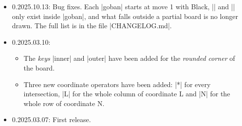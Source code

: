 \begin{itemize}
\begin{itemize}
				\begin{itemize}
					\item |\moves| numbers its moves; |numbers = false| leaves them without a number. |\move|, |\move*| and |\moves*| have been removed.
					\item |\stones| without a player draws neutral stones, like |\stone|.
					\item The only way to remember a board is |name| and |resume|; |goban/remember|, |goban/forget| and |resume| without a name have been removed.
					\item |\pgfgouseprofile| and the other |\pgfgouse...| have been removed; now || is used.
					\item The operator |R| has been removed (|A1 R C3| is |A1:C3|), and |:--:|, \verb+:-|:+ and \verb+:|-:+ are now |--|, \verb+-|-+ and \verb+|-|+.
					\item The territory is drawn when the |goban| ends, with the last |\territory| that marked each point.
					\item A move number is never covered by a label of the file (|LB|) or by |last mark|.
				\end{itemize}
		\end{itemize}
	\item 0.2025.10.13: Bug fixes. Each |goban| starts at move 1 with Black, |\mark| and |\marks| only exist inside |goban|, and what falls outside a partial board is no longer drawn. The full list is in the file |CHANGELOG.md|.
	\item 0.2025.03.10:
		\begin{itemize}
			\item The \emph{keys} |inner| and |outer| have been added for the \emph{rounded corner} of the board.
			\item Three new coordinate operators have been added: |*| for every intersection, |L| for the whole column of coordinate L and |N| for the whole row of coordinate N.
		\end{itemize}
	\item 0.2025.03.07: First release.
\end{itemize}
